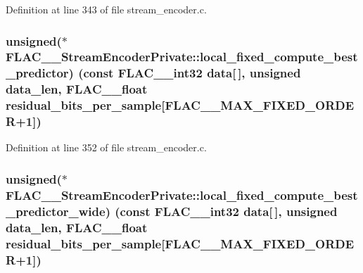 Definition at line 343 of file stream\+\_\+encoder.\+c.

\subsubsection[{\texorpdfstring{local\+\_\+fixed\+\_\+compute\+\_\+best\+\_\+predictor}{local_fixed_compute_best_predictor}}]{\setlength{\rightskip}{0pt plus 5cm}unsigned($\ast$ F\+L\+A\+C\+\_\+\+\_\+\+Stream\+Encoder\+Private\+::local\+\_\+fixed\+\_\+compute\+\_\+best\+\_\+predictor) ({\bf const} {\bf F\+L\+A\+C\+\_\+\+\_\+int32} {\bf data}\mbox{[}$\,$\mbox{]}, unsigned data\+\_\+len, {\bf F\+L\+A\+C\+\_\+\+\_\+float} residual\+\_\+bits\+\_\+per\+\_\+sample\mbox{[}{\bf F\+L\+A\+C\+\_\+\+\_\+\+M\+A\+X\+\_\+\+F\+I\+X\+E\+D\+\_\+\+O\+R\+D\+ER}+1\mbox{]})}\hypertarget{struct_f_l_a_c_____stream_encoder_private_a19c1e35e1f5c261b9721d5b6286b6479}{}\label{struct_f_l_a_c_____stream_encoder_private_a19c1e35e1f5c261b9721d5b6286b6479}


Definition at line 352 of file stream\+\_\+encoder.\+c.

\subsubsection[{\texorpdfstring{local\+\_\+fixed\+\_\+compute\+\_\+best\+\_\+predictor\+\_\+wide}{local_fixed_compute_best_predictor_wide}}]{\setlength{\rightskip}{0pt plus 5cm}unsigned($\ast$ F\+L\+A\+C\+\_\+\+\_\+\+Stream\+Encoder\+Private\+::local\+\_\+fixed\+\_\+compute\+\_\+best\+\_\+predictor\+\_\+wide) ({\bf const} {\bf F\+L\+A\+C\+\_\+\+\_\+int32} {\bf data}\mbox{[}$\,$\mbox{]}, unsigned data\+\_\+len, {\bf F\+L\+A\+C\+\_\+\+\_\+float} residual\+\_\+bits\+\_\+per\+\_\+sample\mbox{[}{\bf F\+L\+A\+C\+\_\+\+\_\+\+M\+A\+X\+\_\+\+F\+I\+X\+E\+D\+\_\+\+O\+R\+D\+ER}+1\mbox{]})}\hypertarget{struct_f_l_a_c_____stream_encoder_private_a30a7f0bfe073e48c3112e6ed6e8998a3}{}\label{struct_f_l_a_c_____stream_encoder_private_a30a7f0bfe073e48c3112e6ed6e8998a3}


